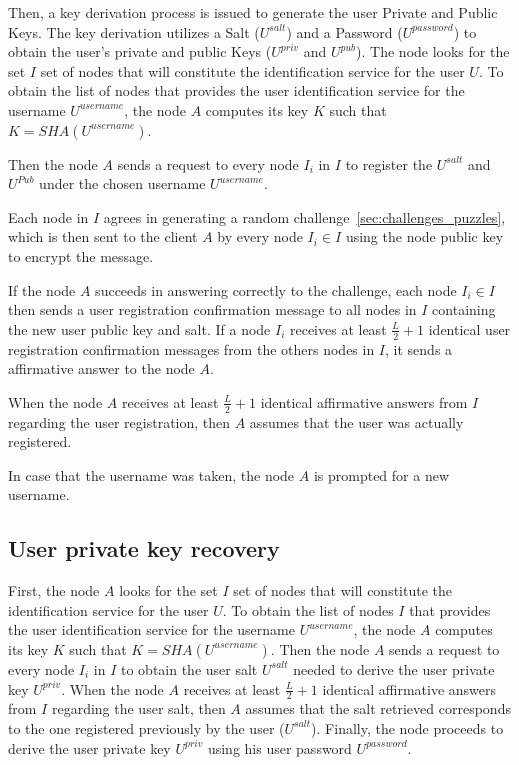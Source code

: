 Then, a key derivation process is issued to generate the user Private and
Public Keys. The
key derivation utilizes a Salt ($U^{salt}$) and a Password ($U^{password}$) to
obtain the user's private and public Keys
($U^{priv}$ and $U^{pub}$).
The node  looks for the set $I$ set of nodes that will constitute the
identification service for the user $U$. To obtain the list of nodes that provides the user identification service for
the username $U^{username}$, the node $A$ computes its key $K$ such that $K =
SHA(U^{username})$. 

Then the node $A$ sends a request to every node $I_i$ in $I$ to register the
$U^{salt}$ and $U^{Pub}$ under the chosen  username  $U^{username}$.

Each node in $I$ agrees in generating a random challenge~\ref{sec:challenges_puzzles}, which is then sent to the
client $A$ by every node $I_i \in I$ using the node public key to encrypt the
message.

If the node $A$ succeeds in answering correctly to the challenge, each node $I_i \in I$ then sends a user registration confirmation message to all nodes
in $I$ containing the new user public key and salt. If a node $I_i$ receives at
least $\frac{L}{2} + 1$ identical user registration confirmation messages from
the others nodes in $I$, it sends a affirmative answer to the node $A$.

When the node
$A$ receives at least $\frac{L}{2} + 1$ identical affirmative answers from
$I$ regarding the user registration, then $A$ assumes that the user was
actually registered.

In case that the username was taken,
the node $A$ is prompted for a new username.



\subsection{User private key recovery}
\label{sec:private_key_recovery}

First, the node $A$ looks for the set $I$ set of nodes that will constitute the
identification service for the user $U$.
To obtain the list of nodes $I$ that provides the user identification service for
the username $U^{username}$, the node $A$ computes its key $K$ such that $K =
SHA(U^{username})$. 
Then the node $A$ sends a request to every node $I_i$ in $I$ to obtain the user
salt $U^{salt}$ needed to derive the user private key $U^{priv}$.
 When the node $A$ receives at least $\frac{L}{2} + 1$ identical affirmative answers from
$I$ regarding the user salt, then $A$ assumes that the salt retrieved
corresponds to the one registered previously by the user ($U^{salt}$). Finally,
the node proceeds to derive the user private key $U^{priv}$ using his user password $U^{password}$.

